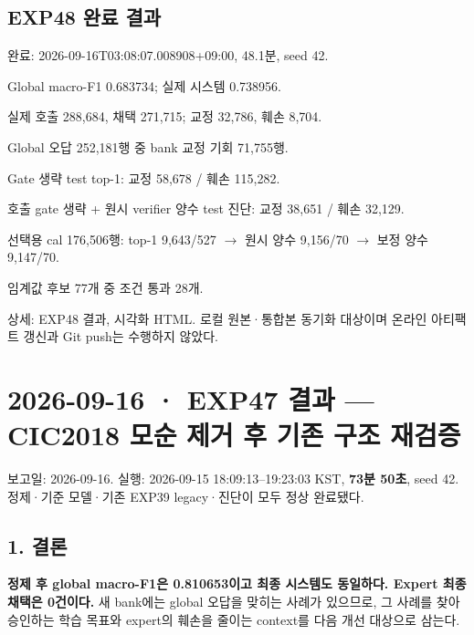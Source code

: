 \subsection{EXP48 완료 결과}
완료: 2026-09-16T03:08:07.008908+\allowbreak{}09:00, 48.1분, seed 42.

\par\noindent \textbullet\enspace Global macro-F1 0.683734; 실제 시스템 0.738956.


\par\noindent \textbullet\enspace 실제 호출 288,684, 채택 271,715; 교정 32,786, 훼손 8,704.


\par\noindent \textbullet\enspace Global 오답 252,181행 중 bank 교정 기회 71,755행.


\par\noindent \textbullet\enspace Gate 생략 test top-1: 교정 58,678 /\allowbreak{} 훼손 115,282.


\par\noindent \textbullet\enspace 호출 gate 생략 +\allowbreak{} 원시 verifier 양수 test 진단: 교정 38,651 /\allowbreak{} 훼손 32,129.


\par\noindent \textbullet\enspace 선택용 cal 176,506행: top-1 9,643/\allowbreak{}527  \ensuremath{\rightarrow}  원시 양수 9,156/\allowbreak{}70  \ensuremath{\rightarrow}  보정 양수 9,147/\allowbreak{}70.


\par\noindent \textbullet\enspace 임계값 후보 77개 중 조건 통과 28개.


상세: EXP48 결과, 시각화 HTML. 로컬 원본·통합본 동기화 대상이며 온라인 아티팩트 갱신과 Git push는 수행하지 않았다.



\section{2026-09-16 · EXP47 결과 — CIC2018 모순 제거 후 기존 구조 재검증}
\label{report:20260916_exp47_results}
보고일: 2026-09-16. 실행: 2026-09-15 18:09:13–19:23:03 KST, \textbf{73분 50초}, seed 42. 정제·기준 모델·기존 EXP39 legacy·진단이 모두 정상 완료됐다.

\subsection{1. 결론}
\textbf{정제 후 global macro-F1은 0.810653이고 최종 시스템도 동일하다. Expert 최종 채택은 0건이다.} 새 bank에는 global 오답을 맞히는 사례가 있으므로, 그 사례를 찾아 승인하는 학습 목표와 expert의 훼손을 줄이는 context를 다음 개선 대상으로 삼는다.

